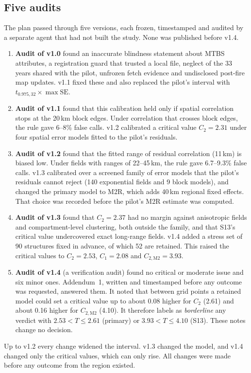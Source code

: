 \documentclass[11pt]{article}
\begin{document}
\subsection{Five audits}
The plan passed through five versions, each frozen, timestamped and audited by a separate agent that had not built the study.
None was published before v1.4.
\begin{enumerate}
\item \textbf{Audit of v1.0} found an inaccurate blindness statement about MTBS attributes, a registration guard that trusted a local file,
  neglect of the 33 years shared with the pilot, unfrozen fetch evidence and undisclosed post-fire map updates.
  v1.1 fixed these and also replaced the pilot's interval with $t_{0.975,32}\times\max\mathrm{SE}$.
\item \textbf{Audit of v1.1} found that this calibration held only if spatial correlation stops at the 20\,km block edges.
  Under correlation that crosses block edges, the rule gave 6--8\% false calls. v1.2 calibrated a critical value $C_2=2.31$ under four
  spatial error models fitted to the pilot's residuals.
\item \textbf{Audit of v1.2} found that the fitted range of residual correlation (11\,km) is biased low. Under fields with ranges of 22--45\,km,
  the rule gave 6.7--9.3\% false calls. v1.3 calibrated over a screened family of error models that the pilot's residuals cannot reject (140 exponential
  fields and 9 block models), and changed the primary model to M2R, which adds 40\,km regional fixed effects. That choice was recorded before the pilot's
  M2R estimate was computed.
\item \textbf{Audit of v1.3} found that $C_2=2.37$ had no margin against anisotropic fields and compartment-level clustering, both outside the family,
  and that S13's critical value under\-covered exact long-range fields. v1.4 added a stress set of 90 structures fixed in advance, of which 52 are retained.
  This raised the critical values to $C_2=2.53$, $C_1=2.08$ and $C_{2,\mathrm{M2}}=3.93$.
\item \textbf{Audit of v1.4} (a verification audit) found no critical or moderate issue and six minor ones. Addendum~1, written and timestamped
  before any outcome was requested, answered them. It noted that between grid points a retained model could set a critical value up to
  about 0.08 higher for $C_2$ (2.61) and about 0.16 higher for $C_{2,\mathrm{M2}}$ (4.10). It therefore labels as \emph{borderline} any verdict with
  $2.53<T\le2.61$ (primary) or $3.93<T\le4.10$ (S13). These notes change no decision.
\end{enumerate}
Up to v1.2 every change widened the interval. v1.3 changed the model, and v1.4 changed only the critical values, which can only rise.
All changes were made before any outcome from the region existed.
\end{document}
